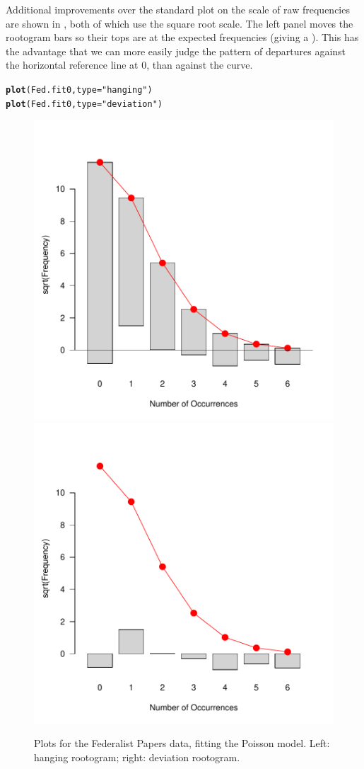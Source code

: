 \documentclass[11pt]{book}\usepackage[]{graphicx}\usepackage[]{color}
\makeatletter
\newcommand{\hlstr}[1]{\textcolor[rgb]{0.192,0.494,0.8}{#1}}%
\newcommand{\hlstd}[1]{\textcolor[rgb]{0.345,0.345,0.345}{#1}}%
\newcommand{\hlkwc}[1]{\textcolor[rgb]{0.333,0.667,0.333}{#1}}%
\newcommand{\hlkwd}[1]{\textcolor[rgb]{0.737,0.353,0.396}{\textbf{#1}}}%
\newenvironment{kframe}{%
 \def\at@end@of@kframe{}%
 \ifinner\ifhmode%
  \def\at@end@of@kframe{\end{minipage}}%
  \begin{minipage}{\columnwidth}%
 \fi\fi%
 \def\FrameCommand##1{\hskip\@totalleftmargin \hskip-\fboxsep
 \colorbox{shadecolor}{##1}\hskip-\fboxsep
     \hskip-\linewidth \hskip-\@totalleftmargin \hskip\columnwidth}%
 \MakeFramed {\advance\hsize-\width
   \@totalleftmargin\z@ \linewidth\hsize
   \@setminipage}}%
 {\par\unskip\endMakeFramed%
 \at@end@of@kframe}
\newenvironment{knitrout}{}{} %
\renewenvironment{knitrout}{\small\renewcommand{\baselinestretch}{.85}}{} %
\makeatother
\begin{document}
Additional improvements over the standard plot on the scale of raw
frequencies are shown in , both of which 
use the square root scale.  The left panel 
moves the rootogram bars so their tops
are at the expected frequencies (giving a ).
This has the advantage that we can more easily judge the pattern
of departures against the horizontal reference line at 0, than
against the curve.

\begin{knitrout}
\color{fgcolor}\begin{kframe}
\begin{alltt}
\hlkwd{plot}\hlstd{(Fed.fit0,} \hlkwc{type}\hlstd{=}\hlstr{"hanging"}\hlstd{)}
\hlkwd{plot}\hlstd{(Fed.fit0,} \hlkwc{type}\hlstd{=}\hlstr{"deviation"}\hlstd{)}
\end{alltt}
\end{kframe}\begin{figure}[htbp]


\centerline{\includegraphics[width=.48\textwidth]{ch03/fig/Fed0-plots21} 
\includegraphics[width=.48\textwidth]{ch03/fig/Fed0-plots22} }

\caption[Plots for the Federalist Papers data, fitting the Poisson model]{Plots for the Federalist Papers data, fitting the Poisson model. Left: hanging rootogram; right: deviation rootogram.\label{fig:Fed0-plots2}}
\end{figure}


\end{knitrout}
\end{document}

